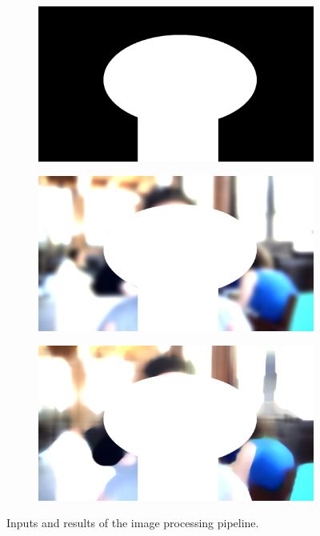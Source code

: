 \documentclass{scrartcl}
\begin{document}
\begin{figure}[h]
\begin{subfigure}{.3\textwidth}
        \label{subfig:input}
    \end{subfigure}\hfill
    \medskip
    \begin{subfigure}{.3\textwidth}
        \centering
        \includegraphics[width=\linewidth]{../../python/mask_big}
        \label{subfig:input}
    \end{subfigure}\hfill
    \begin{subfigure}{.3\textwidth}
        \centering
        \includegraphics[width=\linewidth]{../../python/or_gauss_81}
        \label{subfig:input}
    \end{subfigure}\hfill
    \begin{subfigure}{.3\textwidth}
        \centering
        \includegraphics[width=\linewidth]{../../python/or_median_81}
        \label{subfig:input}
    \end{subfigure}\hfill
    \caption{Inputs and results of the image processing pipeline.}%
    \label{fig:images}%
\end{figure}
\end{document}
